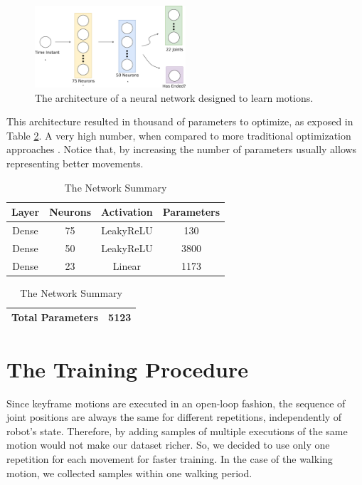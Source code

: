 \begin{figure}[!htbp]
\centering
\includegraphics[width=0.5\textwidth]{Cap5/architecture}
\caption{The architecture of a neural network designed to learn motions.}
\label{fig:model_plot}
\end{figure}

This architecture resulted in thousand of parameters to optimize, as exposed in Table \ref{tab:network_summary}. A very high number, when compared to more traditional optimization approaches \cite{AAAI12-MacAlpine}. Notice that, by increasing the number of parameters usually allows representing better movements.

\begin{table}[htbp]
\caption{The Network Summary}
\begin{center}
\begin{tabular}{|c|c|c|c|}
\hline
\textbf{Layer}&{\textbf{Neurons}}& \textbf{Activation}& \textbf{Parameters} \\
\hline
Dense & 75 & LeakyReLU & 130  \\
\hline
Dense & 50 & LeakyReLU & 3800 \\
\hline
Dense & 23 & Linear & 1173 \\
\hline
\end{tabular}
\begin{tabular}{|c|c|}
\hline
\textbf{Total Parameters} & 5123 \\
\hline
\end{tabular}
\label{tab:network_summary}
\end{center}
\end{table}


\section{The Training Procedure}
Since keyframe motions are executed in an open-loop fashion, the sequence of joint positions are always the same for different repetitions, independently of robot's state. Therefore, by adding samples of multiple executions of the same motion would not make our dataset richer. So, we decided to use only one repetition for each movement for faster training. In the case of the walking motion, we collected samples within one walking period.

